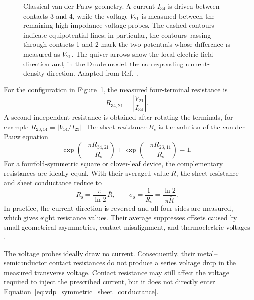 \begin{figure}[htbp]
    \centering
    \scalebox{1.2}{}
    \caption[Classical van der Pauw measurement geometry]{Classical van der
    Pauw geometry. A current $I_{34}$ is driven between contacts 3 and 4, while
    the voltage $V_{21}$ is measured between the remaining high-impedance
    voltage probes. The dashed contours indicate equipotential lines; in
    particular, the contours passing through contacts 1 and 2 mark the two
    potentials whose difference is measured as $V_{21}$. The quiver arrows show
    the local electric-field direction and, in the Drude model, the
    corresponding current-density direction. Adapted from Ref.~\cite{Rolin2017GVDP}.}
    \label{fig:classical_vdp_geometry}
\end{figure}

For the configuration in Figure~\ref{fig:classical_vdp_geometry}, the measured
four-terminal resistance is
\begin{equation}
    R_{34,21}=\left|\frac{V_{21}}{I_{34}}\right|.
    \label{eq:vdp_four_terminal_resistance}
\end{equation}
A second independent resistance is obtained after rotating the terminals, for
example $R_{23,14}=|V_{14}/I_{23}|$. The sheet resistance $R_\mathrm{s}$ is the
solution of the van der Pauw equation~\cite{VanDerPauw1958}
\begin{equation}
    \exp\left(-\frac{\pi R_{34,21}}{R_\mathrm{s}}\right)
    +
    \exp\left(-\frac{\pi R_{23,14}}{R_\mathrm{s}}\right)
    =1.
    \label{eq:vdp_general_relation}
\end{equation}
For a fourfold-symmetric square or clover-leaf device, the complementary
resistances are ideally equal. With their averaged value $\overline{R}$, the
sheet resistance and sheet conductance reduce to
\begin{equation}
    R_\mathrm{s}=\frac{\pi}{\ln 2}\,\overline{R},
    \qquad
    \sigma_\mathrm{s}=\frac{1}{R_\mathrm{s}}
    =\frac{\ln 2}{\pi\overline{R}}.
    \label{eq:vdp_symmetric_sheet_conductance}
\end{equation}
In practice, the current direction is reversed and all four sides are measured,
which gives eight resistance values. Their average suppresses offsets caused by
small geometrical asymmetries, contact misalignment, and thermoelectric
voltages \cite{Rolin2017GVDP,Lee2024GVDPIGZO}.

The voltage probes ideally draw no current. Consequently, their metal--
semiconductor contact resistances do not produce a series voltage drop in the
measured transverse voltage. Contact resistance may still affect the voltage
required to inject the prescribed current, but it does not directly enter
Equation~\eqref{eq:vdp_symmetric_sheet_conductance}.

